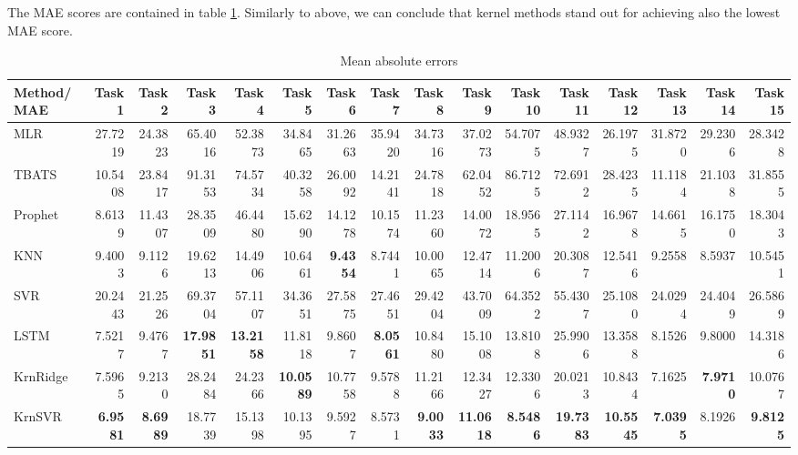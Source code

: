 The MAE scores are contained in table \ref{tab:point_MAE}. Similarly to above, we can conclude that kernel methods stand out for achieving also the lowest MAE score.
\begin{table}[!ht]
    \caption{Mean absolute errors}
    \label{tab:point_MAE}
    \begin{adjustbox}{width=\textwidth, height=3cm}
        \begin{tabular}{lrrrrrrrrrrrrrrr}
            \toprule
             Method/MAE & Task 1 & Task 2 & Task 3 & Task 4 & Task 5 & Task 6 & Task 7 & Task 8 & Task 9 & Task 10 & Task 11 & Task 12 & Task 13 & Task 14 & Task 15 \\
            \midrule
            MLR & 27.7219 & 24.3823 & 65.4016 & 52.3873 & 34.8465 & 31.2663 & 35.9420 & 34.7316 & 37.0273 & 54.7075 & 48.9327 & 26.1975 & 31.8720 & 29.2306 & 28.3428 \\
            TBATS & 10.5408 & 23.8417 & 91.3153 & 74.5734 & 40.3258 & 26.0092 & 14.2141 & 24.7818 & 62.0452 & 86.7125 & 72.6912 & 28.4235 & 11.1184 & 21.1038 & 31.8555 \\
            Prophet & 8.6139 & 11.4307 & 28.3509 & 46.4480 & 15.6290 & 14.1278 & 10.1574 & 11.2360 & 14.0072 & 18.9565 & 27.1142 & 16.9678 & 14.6615 & 16.1750 & 18.3043 \\
            KNN & 9.4003 & 9.1126 & 19.6213 & 14.4906 & 10.6461 & \textbf{9.4354} & 8.7441 & 10.0065 & 12.4714 & 11.2006 & 20.3087 & 12.5416 & 9.2558 & 8.5937 & 10.5451 \\
            SVR & 20.2443 & 21.2526 & 69.3704 & 57.1107 & 34.3651 & 27.5875 & 27.4651 & 29.4204 & 43.7009 & 64.3522 & 55.4307 & 25.1080 & 24.0294 & 24.4049 & 26.5869 \\
            LSTM & 7.5217 & 9.4767 & \textbf{17.9851} & \textbf{13.2158} & 11.8118 & 9.8607 & \textbf{8.0561} & 10.8480 & 15.1008 & 13.8108 & 25.9906 & 13.3588 & 8.1526 & 9.8000 & 14.3186 \\
            KrnRidge & 7.5965 & 9.2130 & 28.2484 & 24.2366 & \textbf{10.0589} & 10.7758 & 9.5788 & 11.2166 & 12.3427 & 12.3306 & 20.0213 & 10.8434 & 7.1625 & \textbf{7.9710} & 10.0767 \\
            KrnSVR & \textbf{6.9581} & \textbf{8.6989} & 18.7739 & 15.1398 & 10.1395 & 9.5927 & 8.5731 & \textbf{9.0033} & \textbf{11.0618} & \textbf{8.5486} & \textbf{19.7383} & \textbf{10.5545} & \textbf{7.0395} & 8.1926 & \textbf{9.8125} \\
            \bottomrule
            \end{tabular}            
    \end{adjustbox}            
\end{table}

